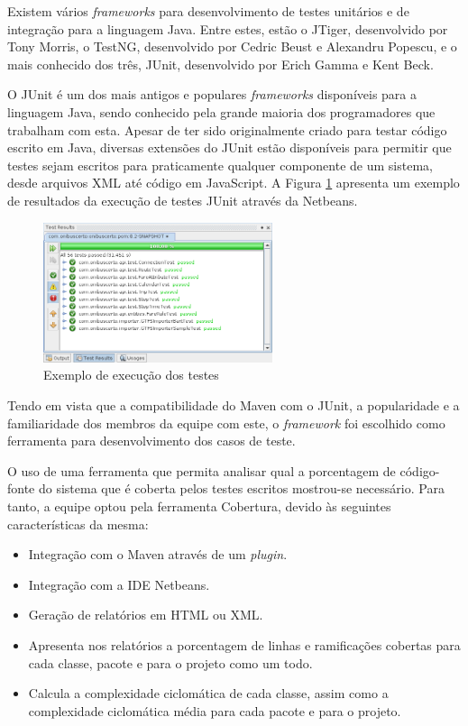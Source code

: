 Existem vários \emph{frameworks} para desenvolvimento de testes unitários e de integração para a linguagem Java.
Entre estes, estão o JTiger, desenvolvido por Tony Morris, o TestNG, desenvolvido por Cedric Beust e Alexandru Popescu, e o mais conhecido dos três, JUnit, desenvolvido por Erich Gamma e Kent Beck.

O JUnit é um dos mais antigos e populares \emph{frameworks} disponíveis para a linguagem Java, sendo conhecido pela grande maioria dos programadores que trabalham com esta.
Apesar de ter sido originalmente criado para testar código escrito em Java, diversas extensões do JUnit estão disponíveis para permitir que testes sejam escritos para praticamente qualquer componente de um sistema, desde arquivos XML até código em JavaScript.
A Figura \ref{fig:testes} apresenta um exemplo de resultados da execução de testes JUnit através da  Netbeans.
\begin{figure}[!htb]
	\centering
	\includegraphics[width=0.6\textwidth]{./imgs/testes.png}
	\caption[Exemplo de execução dos testes]{Exemplo de execução dos testes}
	\label{fig:testes}
\end{figure}

Tendo em vista que a compatibilidade do Maven com o JUnit, a popularidade e a familiaridade dos membros da equipe com este, o \emph{framework} foi escolhido como ferramenta para desenvolvimento dos casos de teste.

O uso de uma ferramenta que permita analisar qual a porcentagem de código-fonte do sistema que é coberta pelos testes escritos mostrou-se necessário.
Para tanto, a equipe optou pela ferramenta Cobertura, devido às seguintes características da mesma:

\begin{itemize}
	\item Integração com o Maven através de um \emph{plugin}.
	\item Integração com a IDE Netbeans.
	\item Geração de relatórios em HTML ou XML.
	\item Apresenta nos relatórios a porcentagem de linhas e ramificações cobertas para cada classe, pacote e para o projeto como um todo.
	\item Calcula a complexidade ciclomática de cada classe, assim como a complexidade ciclomática média para cada pacote e para o projeto.
\end{itemize}

